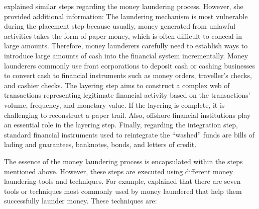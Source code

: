 \citet{buchanan2004money} explained similar steps regarding the money laundering process. However, she provided additional information: The laundering mechanism is most vulnerable during the placement step because usually, money generated from unlawful activities takes the form of paper money, which is often difficult to conceal in large amounts. Therefore, money launderers carefully need to establish ways to introduce large amounts of cash into the financial system incrementally. Money launderers commonly use front corporations to deposit cash or cashing businesses to convert cash to financial instruments such as money orders, traveller's checks, and cashier checks. The layering step aims to construct a complex web of transactions representing legitimate financial activity based on the transactions' volume, frequency, and monetary value. If the layering is complete, it is challenging to reconstruct a paper trail. Also, offshore financial institutions play an essential role in the layering step. Finally, regarding the integration step, standard financial instruments used to reintegrate the ``washed'' funds are bills of lading and guarantees, banknotes, bonds, and letters of credit.   	      

The essence of the money laundering process is encapsulated within the steps mentioned above. However, these steps are executed using different money laundering tools and techniques. For example, \citet{buchanan2004money} explained that there are seven tools or techniques most commonly used by money laundered that help them successfully launder money. These techniques are:

